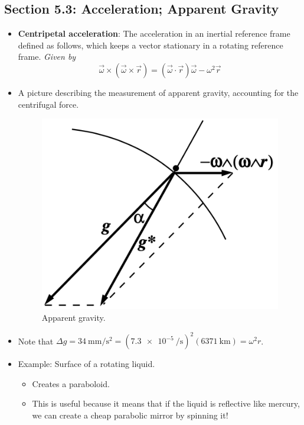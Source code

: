 \documentclass[../notes.tex]{subfiles}
\begin{document}
\subsection*{Section 5.3: Acceleration; Apparent Gravity}
\begin{itemize}
    \item \textbf{Centripetal acceleration}: The acceleration in an inertial reference frame defined as follows, which keeps a vector stationary in a rotating reference frame. \emph{Given by}
    \begin{equation*}
        \vec{\omega}\times(\vec{\omega}\times\vec{r}) = (\vec{\omega}\cdot\vec{r})\vec{\omega}-\omega^2\vec{r}
    \end{equation*}
    \item A picture describing the measurement of apparent gravity, accounting for the centrifugal force.
    \begin{figure}[h!]
        \centering
        \includegraphics[width=0.25\linewidth]{../ExtFiles/apparentGravity.png}
        \caption{Apparent gravity.}
        \label{fig:apparentGravity}
    \end{figure}
    \item Note that $\Delta g=\SI[per-mode=symbol]{34}{\milli\meter\per\second\squared}=(\SI{7.3e-5}{\per\second})^2(\SI{6371}{\kilo\meter})=\omega^2r$.
    \item Example: Surface of a rotating liquid.
    \begin{itemize}
        \item Creates a paraboloid.
        \item This is useful because it means that if the liquid is reflective like mercury, we can create a cheap parabolic mirror by spinning it!
    \end{itemize}
\end{itemize}
\end{document}
